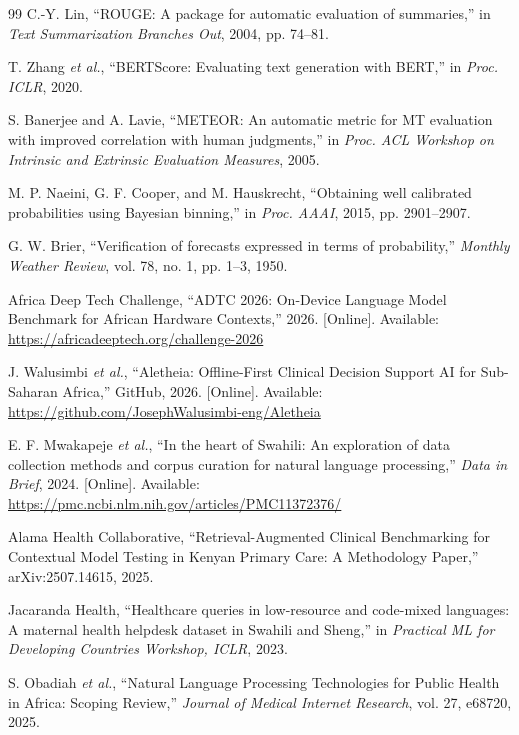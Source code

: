 \documentclass[journal]{IEEEtran}
\begin{document}
\begin{thebibliography}{99}
C.-Y. Lin,
``ROUGE: A package for automatic evaluation of summaries,''
in \textit{Text Summarization Branches Out}, 2004, pp. 74--81.

T. Zhang \textit{et al.},
``BERTScore: Evaluating text generation with BERT,''
in \textit{Proc. ICLR}, 2020.

S. Banerjee and A. Lavie,
``METEOR: An automatic metric for MT evaluation with improved correlation with human judgments,''
in \textit{Proc. ACL Workshop on Intrinsic and Extrinsic Evaluation Measures}, 2005.

M. P. Naeini, G. F. Cooper, and M. Hauskrecht,
``Obtaining well calibrated probabilities using Bayesian binning,''
in \textit{Proc. AAAI}, 2015, pp. 2901--2907.

G. W. Brier,
``Verification of forecasts expressed in terms of probability,''
\textit{Monthly Weather Review}, vol. 78, no. 1, pp. 1--3, 1950.

Africa Deep Tech Challenge, ``ADTC 2026: On-Device Language Model
Benchmark for African Hardware Contexts,'' 2026.
[Online]. Available: \url{https://africadeeptech.org/challenge-2026}

J. Walusimbi \textit{et al.},
``Aletheia: Offline-First Clinical Decision Support AI
for Sub-Saharan Africa,''
GitHub, 2026. [Online]. Available:
\url{https://github.com/JosephWalusimbi-eng/Aletheia}

E. F. Mwakapeje \textit{et al.},
``In the heart of Swahili: An exploration of data collection
methods and corpus curation for natural language processing,''
\textit{Data in Brief}, 2024.
[Online]. Available: \url{https://pmc.ncbi.nlm.nih.gov/articles/PMC11372376/}

Alama Health Collaborative,
``Retrieval-Augmented Clinical Benchmarking for Contextual
Model Testing in Kenyan Primary Care: A Methodology Paper,''
arXiv:2507.14615, 2025.

Jacaranda Health,
``Healthcare queries in low-resource and code-mixed languages:
A maternal health helpdesk dataset in Swahili and Sheng,''
in \textit{Practical ML for Developing Countries Workshop, ICLR},
2023.

S. Obadiah \textit{et al.},
``Natural Language Processing Technologies for Public Health
in Africa: Scoping Review,''
\textit{Journal of Medical Internet Research}, vol. 27, e68720, 2025.

\end{thebibliography}
\end{document}
